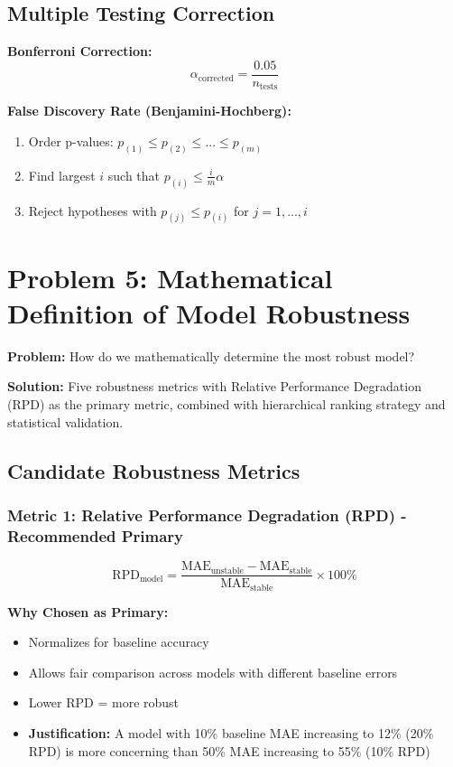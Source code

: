 \documentclass[11pt,a4paper]{article}
\begin{document}
\subsection{Multiple Testing Correction}

\textbf{Bonferroni Correction:}
\begin{equation}
\alpha_{\text{corrected}} = \frac{0.05}{n_{\text{tests}}}
\end{equation}

\textbf{False Discovery Rate (Benjamini-Hochberg):}
\begin{enumerate}
    \item Order p-values: $p_{(1)} \leq p_{(2)} \leq ... \leq p_{(m)}$
    \item Find largest $i$ such that $p_{(i)} \leq \frac{i}{m} \alpha$
    \item Reject hypotheses with $p_{(j)} \leq p_{(i)}$ for $j = 1, ..., i$
\end{enumerate}

\section{Problem 5: Mathematical Definition of Model Robustness}

\begin{problembox}
\textbf{Problem:} How do we mathematically determine the most robust model?
\end{problembox}

\begin{solutionbox}
\textbf{Solution:} Five robustness metrics with Relative Performance Degradation (RPD) as the primary metric, combined with hierarchical ranking strategy and statistical validation.
\end{solutionbox}

\subsection{Candidate Robustness Metrics}

\subsubsection{Metric 1: Relative Performance Degradation (RPD) - Recommended Primary}

\begin{mathbox}
$$\text{RPD}_{\text{model}} = \frac{\text{MAE}_{\text{unstable}} - \text{MAE}_{\text{stable}}}{\text{MAE}_{\text{stable}}} \times 100\%$$

\textbf{Why Chosen as Primary:}
\begin{itemize}
    \item Normalizes for baseline accuracy
    \item Allows fair comparison across models with different baseline errors
    \item Lower RPD = more robust
    \item \textbf{Justification:} A model with 10\% baseline MAE increasing to 12\% (20\% RPD) is more concerning than 50\% MAE increasing to 55\% (10\% RPD)
\end{itemize}
\end{mathbox}
\end{document}
